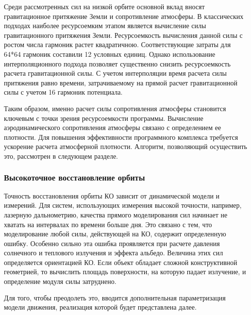 Среди рассмотренных сил на низкой орбите основной вклад вносят гравитационное притяжение Земли 
и сопротивление атмосферы.
В классических подходах наиболее ресурсоемким этапом является вычисление силы гравитационного 
притяжения Земли. Ресурсоемкость вычисления данной силы с ростом числа гармоник растет квадратичною.
Соответствующие затраты для 64*64 гармоник составили 12 условных единиц.
Однако использование интерполяционного подхода \cite{kuznetsov2023} позволяет существенно 
снизить ресурсоемкость расчета гравитационной силы. С учетом интерполяции время
расчета силы притяжения равно времени, затрачиваемому на прямой расчет гравитационной силы
с учетом 16 гармоник потенциала. 

Таким образом, именно расчет силы 
сопротивления атмосферы становится ключевым с точки зрения ресурсоемкости программы.
Вычисление аэродинамического сопротивления атмосферы связано 
с определением ее плотности.
Для повышения эффективности программного комплекса требуется ускорение расчета атмосферной плотности.
Алгоритм, позволяющий осуществить это, рассмотрен в следующем разделе.

\subsubsection{Высокоточное восстановление орбиты}
Точность восстановления орбиты КО зависит от динамической модели и измерений.
Для систем, использующих измерения высокой точности, например, лазерную дальнометрию,
качества прямого моделирования сил начинает не хватать на интервалах по времени
больше дня. Это связано с тем, что моделирование
любой силы, действующей на КО, содержит определенную ошибку. Особенно сильно эта ошибка
проявляется при расчете давления солнечного и теплового излучения и эффекта альбедо. 
Величина этих сил определяется ориентацией КО. Если объект обладает сложной конструктивной геометрией,
то вычислить площадь поверхности, на которую падает излучение, и определение модуля силы затруднено. 

Для того, чтобы преодолеть это, вводится дополнительная параметризация модели движения,
реализация которой будет представлена далее.